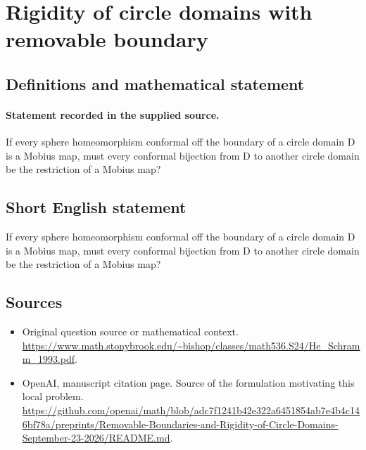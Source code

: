 \documentclass[11pt]{article}
\begin{document}
\section*{Rigidity of circle domains with removable boundary}\label{30007434}
\subsection{Definitions and mathematical statement}
\paragraph{Statement recorded in the supplied source.}
If every sphere homeomorphism conformal off the boundary of a circle domain D is a Mobius map, must every conformal bijection from D to another circle domain be the restriction of a Mobius map?
\subsection{Short English statement}
If every sphere homeomorphism conformal off the boundary of a circle domain D is a Mobius map, must every conformal bijection from D to another circle domain be the restriction of a Mobius map?
\subsection{Sources}
\begin{itemize}
\item[S1] Original question source or mathematical context.
\url{https://www.math.stonybrook.edu/~bishop/classes/math536.S24/He_Schramm_1993.pdf}.
\item[S2] OpenAI, manuscript citation page. Source of the formulation motivating this local problem.
\url{https://github.com/openai/math/blob/adc7f1241b42e322a6451854ab7e4b4c146bf78a/preprints/Removable-Boundaries-and-Rigidity-of-Circle-Domains-September-23-2026/README.md}.
\end{itemize}
\end{document}

